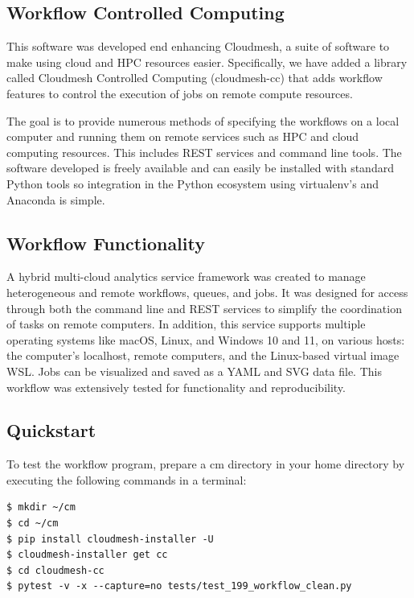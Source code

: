 \subsection{Workflow Controlled
Computing}\label{workflow-controlled-computing}

This software was developed end enhancing Cloudmesh, a suite of software
to make using cloud and HPC resources easier. Specifically, we have
added a library called Cloudmesh Controlled Computing (cloudmesh-cc)
that adds workflow features to control the execution of jobs on remote
compute resources.

The goal is to provide numerous methods of specifying the workflows on a
local computer and running them on remote services such as HPC and cloud
computing resources. This includes REST services and command line tools.
The software developed is freely available and can easily be installed
with standard Python tools so integration in the Python ecosystem using
virtualenv's and Anaconda is simple.


\subsection{Workflow Functionality}\label{workflow-functionality}

A hybrid multi-cloud analytics service framework was created to manage
heterogeneous and remote workflows, queues, and jobs. It was designed
for access through both the command line and REST services to simplify
the coordination of tasks on remote computers. In addition, this service
supports multiple operating systems like macOS, Linux, and Windows 10
and 11, on various hosts: the computer's localhost, remote computers,
and the Linux-based virtual image WSL. Jobs can be visualized and saved
as a YAML and SVG data file. This workflow was extensively tested for
functionality and reproducibility.

\subsection{Quickstart}\label{quickstart}

To test the workflow program, prepare a cm directory in your home
directory by executing the following commands in a terminal:

\bigbreak
\begin{verbatim}
$ mkdir ~/cm
$ cd ~/cm
$ pip install cloudmesh-installer -U
$ cloudmesh-installer get cc
$ cd cloudmesh-cc
$ pytest -v -x --capture=no tests/test_199_workflow_clean.py
\end{verbatim}
\bigbreak

